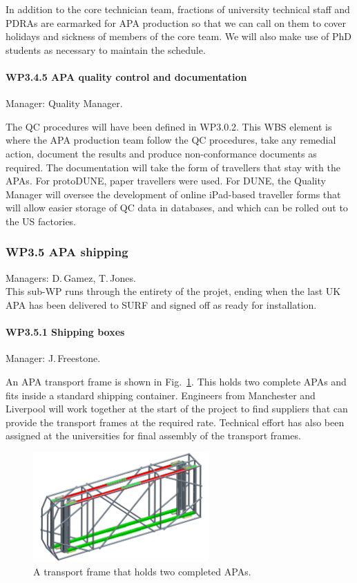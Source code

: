 In addition to the core technician team, fractions of university technical staff and PDRAs are earmarked for APA production so that we can call on them to cover holidays and sickness of members of the core team. We will also make use of PhD students as necessary to maintain the schedule.


\paragraph{WP3.4.5 APA quality control and documentation} Manager: Quality Manager.

The QC procedures will have been defined in WP3.0.2. This WBS element is where the APA production team follow the QC procedures, take any remedial action, document the results and produce non-conformance documents as required. The documentation will take the form of travellers that stay with the APAs. For protoDUNE, paper travellers were used. For DUNE, the Quality Manager will oversee the development of online iPad-based traveller forms that will allow easier storage of QC data in databases, and which can be rolled out to the US factories.

\subsubsection{WP3.5 APA shipping} Managers: D.\,Gamez, T.\,Jones.\\
This sub-WP runs through the entirety of the projet, ending when the last UK APA has been delivered to SURF and signed off as ready for installation.

\paragraph{WP3.5.1 Shipping boxes} Manager: J.\,Freestone.

An APA transport frame is shown in Fig.~\ref{fig:TransportFrame}. This holds two complete APAs and fits inside a standard shipping container. Engineers from Manchester and Liverpool will work together at the start of the project to find suppliers that can provide the transport frames at the required rate. Technical effort has also been assigned at the universities for final assembly of the transport frames.

\begin{figure}
    \centering
    \includegraphics[width=0.6\textwidth]{figs/WP3/APATransportFrame.png}
    \caption{A transport frame that holds two completed APAs.}
    \label{fig:TransportFrame}
\end{figure}

